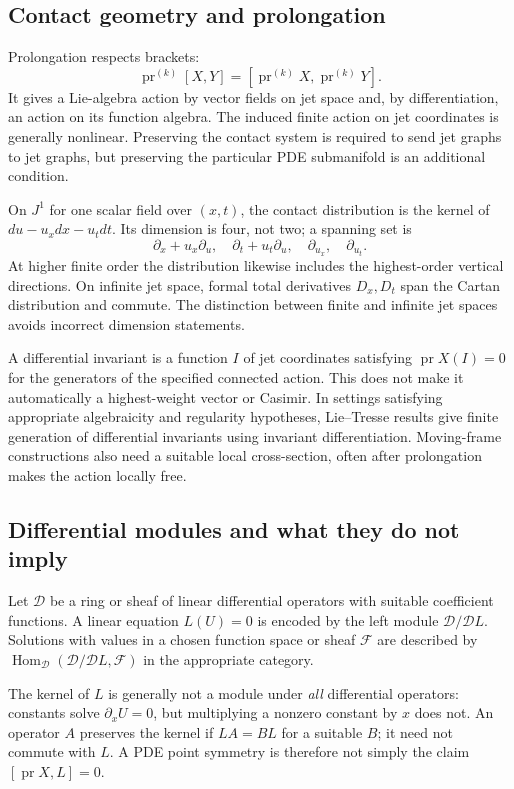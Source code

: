 \documentclass[11pt,a4paper]{article}
\numberwithin{equation}{section}
\theoremstyle{definition}
\theoremstyle{plain}
\theoremstyle{remark}
\newcommand{\pr}{\operatorname{pr}}
\begin{document}
\subsection{Contact geometry and prolongation}
Prolongation respects brackets:
\[
\pr^{(k)}[X,Y]=[\pr^{(k)}X,\pr^{(k)}Y].
\]
It gives a Lie-algebra action by vector fields on jet space and, by differentiation, an action on its function algebra. The induced finite action on jet coordinates is generally nonlinear. Preserving the contact system is required to send jet graphs to jet graphs, but preserving the particular PDE submanifold is an additional condition.

On $J^1$ for one scalar field over $(x,t)$, the contact distribution is the kernel of $du-u_xdx-u_tdt$. Its dimension is four, not two; a spanning set is
\[
\partial_x+u_x\partial_u,\quad\partial_t+u_t\partial_u,
\quad\partial_{u_x},\quad\partial_{u_t}.
\]
At higher finite order the distribution likewise includes the highest-order vertical directions. On infinite jet space, formal total derivatives $D_x,D_t$ span the Cartan distribution and commute. The distinction between finite and infinite jet spaces avoids incorrect dimension statements.

A differential invariant is a function $I$ of jet coordinates satisfying $\pr X(I)=0$ for the generators of the specified connected action. This does not make it automatically a highest-weight vector or Casimir. In settings satisfying appropriate algebraicity and regularity hypotheses, Lie--Tresse results give finite generation of differential invariants using invariant differentiation. Moving-frame constructions also need a suitable local cross-section, often after prolongation makes the action locally free.

\subsection{Differential modules and what they do not imply}
Let $\mathcal D$ be a ring or sheaf of linear differential operators with suitable coefficient functions. A linear equation $L(U)=0$ is encoded by the left module $\mathcal D/\mathcal D L$. Solutions with values in a chosen function space or sheaf $\mathcal F$ are described by $\operatorname{Hom}_{\mathcal D}(\mathcal D/\mathcal D L,\mathcal F)$ in the appropriate category.

The kernel of $L$ is generally not a module under \emph{all} differential operators: constants solve $\partial_x U=0$, but multiplying a nonzero constant by $x$ does not. An operator $A$ preserves the kernel if $LA=BL$ for a suitable $B$; it need not commute with $L$. A PDE point symmetry is therefore not simply the claim $[\pr X,L]=0$.
\end{document}
